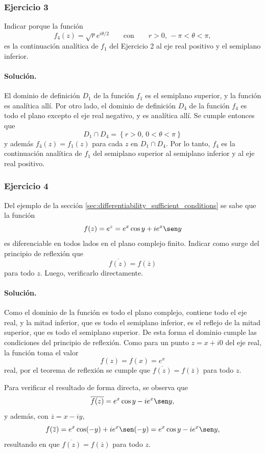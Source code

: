 \documentclass[a4paper]{report}
\begin{document}
\subsubsection{Ejercicio 3}

Indicar porque la función 
\[
 f_4(z)=\sqrt{r}e^{i\theta/2}\qquad\textrm{con}\qquad r>0,\,-\pi<\theta<\pi,
\]
es la continuación analítica de \(f_1\) del Ejercicio 2 al eje real positivo y el semiplano inferior.

\paragraph{Solución.} El dominio de definición \(D_1\) de la función \(f_1\) es el semiplano superior, y la función es analítica allí. Por otro lado, el dominio de definición \(D_4\) de la función \(f_4\) es todo el plano excepto el eje real negativo, y es analítica allí. Se cumple entonces que 
\[
 D_1\cap D_4=\left\{r>0,\,0<\theta<\pi\right\}
\]
y además \(f_4(z)=f_1(z)\) para cada \(z\) en \(D_1\cap D_4\). Por lo tanto, \(f_4\) es la continuación analítica de \(f_1\) del semiplano superior al semiplano inferior y al eje real positivo.

\subsubsection{Ejercicio 4}

Del ejemplo de la sección \ref{sec:differentiability_sufficient_conditions} se sabe que la función 
\[
 f(z)=e^z=e^x\cos y+ie^x\sen y
\]
es diferenciable en todos lados en el plano complejo finito. Indicar como surge del principio de reflexión que 
\[
 \overline{f(z)}=f(\overline{z})
\]
para todo \(z\). Luego, verificarlo directamente.

\paragraph{Solución.} Como el dominio de la función es todo el plano complejo, contiene todo el eje real, y la mitad inferior, que es todo el semiplano inferior, es el reflejo de la mitad superior, que es todo el semiplano superior. De esta forma el dominio cumple las condiciones del principio de reflexión. Como para un punto \(z=x+i0\) del eje real, la función toma el valor
\[
 f(z)=f(x)=e^x
\]
real, por el teorema de reflexión se cumple que \(\overline{f(z)}=f(\overline{z})\) para todo \(z\).

Para verificar el resultado de forma directa, se observa que 
\[
 \overline{f(z)}=e^x\cos y-ie^x\sen y,
\]
y además, con \(\overline{z}=x-iy\),
\[
 f(\overline{z})=e^x\cos(-y)+ie^x\sen(-y)=e^x\cos y-ie^x\sen y,
\]
resultando en que \(\overline{f(z)}=f(\overline{z})\) para todo \(z\).
\end{document}
